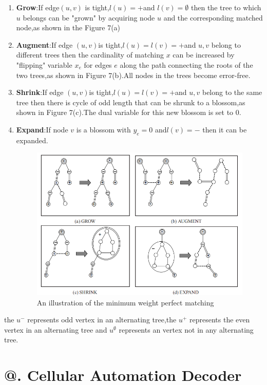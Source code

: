 \documentclass[
	a4paper, %
	10pt, %
	unnumberedsections, %
	twoside, %
]{LTJournalArticle}
\makeatletter
\newcommand{\Rmnum}[1]{\expandafter\@slowromancap\romannumeral #1@}
\makeatother
\begin{document}
\begin{enumerate}
	\item \textbf{Grow}:If edge$(u,v)$ is tight,$l(u) = + $and $l(v) = \emptyset$ then the tree to which $u$ belongs can be "grown" by acquiring node $u$ and the corresponding matched node,as shown in the Figure 7(a)
	\item \textbf{Augment}:If edge $(u,v) $is tight,$l(u) = l(v) = + $and $u,v$ belong to different trees then the cardinality of matching $x$ can be increased by "flipping" variable $x_e$ for edges $e$ along the path connecting the roots of the two trees,as shown in Figure 7(b).All nodes in the trees become error-free.
	\item \textbf{Shrink}:If edge $(u,v) $is tight,$l(u) = l(v) = + $and $u,v$ belong to the same tree then there is cycle of odd length that can be shrunk to a blossom,as shown in Figure 7(c).The dual variable for this new blossom is set to 0.
	\item \textbf{Expand}:If node $v$ is a blossom with $y_e = 0$ and$l(v) = -$ then it can be expanded.
\begin{figure} %
	\setlength{\abovecaptionskip}{0.cm} %
	\setlength{\abovecaptionskip}{0.cm} 
	\includegraphics[width=\linewidth]{img/minimum weight.png}
	\caption{An illustration of the minimum weight perfect matching}
\end{figure}
\end{enumerate}
	the $u^-$ represents odd vertex in an alternating tree,the $u^+$ represents the even vertex in an alternating tree and $u^{\emptyset}$ represents an vertex not in any alternating tree.
\section{\Rmnum{4}. Cellular Automation Decoder}
\end{document}

